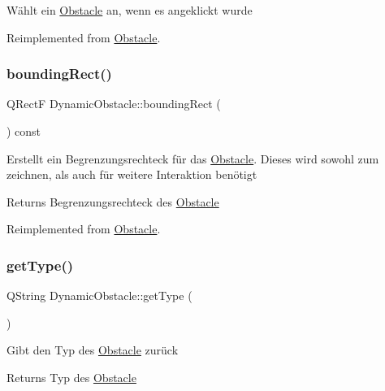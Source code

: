 Wählt ein \mbox{\hyperlink{class_obstacle}{Obstacle}} an, wenn es angeklickt wurde 

Reimplemented from \mbox{\hyperlink{class_obstacle_ac3bcd488b16a8d8cf99875c6d0172e15}{Obstacle}}.

\mbox{\label{class_dynamic_obstacle_ac1b0b15d722a45decc8b77fcde22efd0}} 
\subsubsection{\texorpdfstring{bounding\+Rect()}{boundingRect()}}
{\footnotesize\ttfamily Q\+RectF Dynamic\+Obstacle\+::bounding\+Rect (\begin{DoxyParamCaption}{ }\end{DoxyParamCaption}) const\hspace{0.3cm}{\ttfamily [virtual]}}

Erstellt ein Begrenzungsrechteck für das \mbox{\hyperlink{class_obstacle}{Obstacle}}. Dieses wird sowohl zum zeichnen, als auch für weitere Interaktion benötigt \begin{DoxyReturn}{Returns}
Begrenzungsrechteck des \mbox{\hyperlink{class_obstacle}{Obstacle}} 
\end{DoxyReturn}


Reimplemented from \mbox{\hyperlink{class_obstacle_a6f02b341e339ea27c3391a44c787b5f2}{Obstacle}}.

\mbox{\label{class_dynamic_obstacle_ac52c38ef60b99a7a29f89b6eb23df460}} 
\subsubsection{\texorpdfstring{get\+Type()}{getType()}}
{\footnotesize\ttfamily Q\+String Dynamic\+Obstacle\+::get\+Type (\begin{DoxyParamCaption}{ }\end{DoxyParamCaption})\hspace{0.3cm}{\ttfamily [virtual]}}

Gibt den Typ des \mbox{\hyperlink{class_obstacle}{Obstacle}} zurück \begin{DoxyReturn}{Returns}
Typ des \mbox{\hyperlink{class_obstacle}{Obstacle}} 
\end{DoxyReturn}


